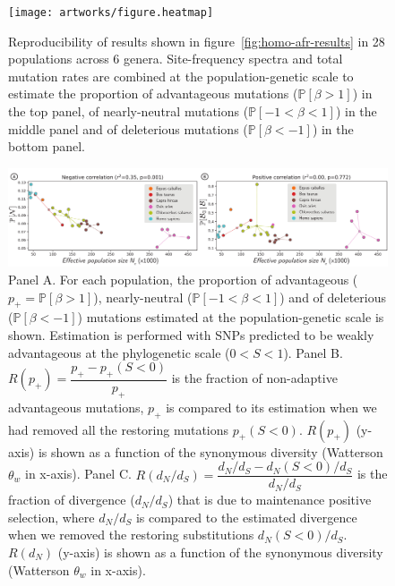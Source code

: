\documentclass{article}
\newcommand{\proba}{\mathbb{P}}
\newcommand{\dn}{d_N}
\newcommand{\ds}{d_S}
\newcommand{\dnds}{\dn / \ds}
\newcommand{\Sphy}{S}
\newcommand{\divWeakAdv}{0 < \Sphy < 1}
\newcommand{\Spop}{\beta}
\newcommand{\polyDel}{\Spop < -1}
\newcommand{\polyNeutral}{-1 < \Spop < 1}
\newcommand{\polyAdv}{ \Spop > 1}
\newcommand{\PpolyDel}{\proba \left[ \polyDel \right]}
\newcommand{\PpolyNeutral}{\proba \left[ \polyNeutral \right]}
\newcommand{\PpolyAdv}{\proba \left[ \polyAdv \right]}
\begin{document}
    \begin{figure}[!ht]
        \centering
        \texttt{[image: artworks/figure.heatmap]}
        \caption{
            Reproducibility of results shown in figure~\ref{fig:homo-afr-results} in 28 populations across 6 genera.
            Site-frequency spectra and total mutation rates are combined at the population-genetic scale to estimate the proportion of advantageous mutations ($\PpolyAdv$) in the top panel, of nearly-neutral mutations ($\PpolyNeutral$) in the middle panel and of deleterious mutations ($\PpolyDel$) in the bottom panel.
        }
        \label{fig:heatmap}
    \end{figure}

    \begin{figure}[!ht]
        \centering
        \includegraphics[width=\textwidth, page=1] {artworks/figure.diversity}
        \caption{
            Panel A. For each population, the proportion of advantageous ($p_+=\PpolyAdv$), nearly-neutral ($\PpolyNeutral$) and of deleterious ($\PpolyDel$) mutations estimated at the population-genetic scale is shown.
            Estimation is performed with SNPs predicted to be weakly advantageous at the phylogenetic scale ($\divWeakAdv$).
            Panel B. $R(p_+)=\dfrac{p_+ - p_+(\Sphy < 0)}{p_+}$ is the fraction of non-adaptive advantageous mutations, $p_+$ is compared to its estimation when we had removed all the restoring mutations $p_+(\Sphy < 0)$.
            $R(p_+)$ (y-axis) is shown as a function of the synonymous diversity (Watterson $\theta_w$ in x-axis).
            Panel C. $R(\dnds)=\dfrac{\dnds - \dn(\Sphy < 0) / \ds}{\dnds}$ is the fraction of divergence ($\dnds$) that is due to maintenance positive selection, where $\dnds$ is compared to the estimated divergence when we removed the restoring substitutions $\dn(\Sphy < 0)/\ds$.
            $R(\dn)$ (y-axis) is shown as a function of the synonymous diversity (Watterson $\theta_w$ in x-axis).
        }
        \label{fig:diversity}
    \end{figure}
\end{document}
